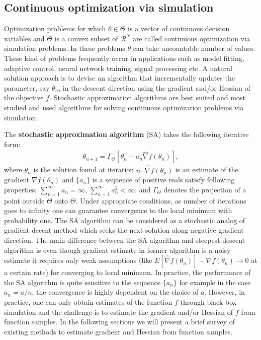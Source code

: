 \subsection{Continuous optimization via simulation}
Optimization problems for which $\theta \in \Theta$ is a vector of continuous decision variables and $\Theta$ is a convex subset of $\mathcal{R}^N$ are called continuous optimization via simulation  problems. In these problems $\theta$ can take uncountable number of values. These kind of problems frequently occur in applications such as model fitting, adaptive control, neural network training, signal processing etc. A natural solution approach is to devise an algorithm that incrementally updates the parameter, say $\theta_n$, in the descent direction using the gradient and/or Hessian of the objective $f$. Stochastic approximation algorithms are best suited and most studied and used algorithms for solving continuous optimization problems via simulation.\par
The \textbf{stochastic approximation algorithm} (SA) takes the following iterative form:
\begin{align}\label{saalg}
\theta_{n+1} = \Gamma_{\Theta} \left [\theta_{n} - a_{n} \widehat{\nabla} f(\theta_{n}) \right],
\end{align}
where $\theta_{n}$ is the solution found at iteration $n$. $ \widehat{\nabla} f(\theta_{n})$ is an estimate of the gradient $ {\nabla} f(\theta_{n})$ and $\{a_{n}\}$ is a sequence of positive reals satisfy following properties: $\sum_{n=1}^{\infty} a_{n}  = \infty$,  $\sum_{n = 1}^{\infty} a_{n}^{2} < \infty$, and $\Gamma_{\Theta}$ denotes the projection of a point outside $\Theta$ onto $\Theta$. Under appropriate conditions, as number of iterations goes to infinity one can guarantee convergence to the local minimum with probability one. The SA algorithm can be considered as a stochastic analog of gradient decent method which seeks the next solution along negative gradient direction. The main difference between the SA algorithm and steepest descent algorithm is even though gradient estimate in former algorithm is a noisy estimate it requires only weak assumptions (like $E \left[\widehat{\nabla} f(\theta_{n})\right] - \nabla f(\theta_{n}) \to 0 $ at a certain rate) for converging to local minimum. In practice, the performance of the SA algorithm is quite sensitive to the sequence $\{a_{n}\}$ for example in the case $ a_n = a/n$, the convergence is highly dependent on the choice of $a$. However, in practice, one can only obtain estimates of the function $f$ through black-box simulation and the challenge is to estimate the gradient and/or Hessian of $f$ from function samples.  In the following sections we will present a brief survey of existing methods to estimate gradient and Hessian from function samples.
%
